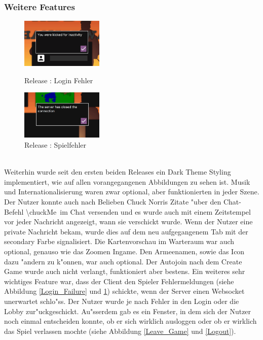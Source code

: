 \documentclass[12pt, titlepage]{scrartcl}
\newcommand{\RN}[1]{%
	\textup{\uppercase\expandafter{\romannumeral#1}}%
}
\begin{document}
		    \subsubsection{Weitere Features}
		        \begin{figure}
                    \begin{center}
                        \includegraphics[width=0.35\textwidth]{images/old_state/additional/LoginFailure.png}
                        \caption{Release \RN{2}: Login Fehler}
                        \label{Login_Failure}
                    \end{center}
                    \begin{center}
                        \includegraphics[width=0.35\textwidth]{images/old_state/additional/WaitingRoomFailure.png}
                        \caption{Release \RN{2}: Spielfehler}
                        \label{Game_Failure}
                    \end{center}
                \end{figure}
		        \ \\ Weiterhin wurde seit den ersten beiden Releases ein Dark Theme Styling implementiert, wie auf allen vorangegangenen Abbildungen zu sehen ist. Musik und Internationalisierung waren zwar optional, aber funktionierten in jeder Szene. Der Nutzer konnte auch nach Belieben Chuck Norris Zitate "uber den Chat-Befehl \glqq \textbackslash chuckMe\grqq\ im Chat versenden und es wurde auch mit einem Zeitstempel vor jeder Nachricht angezeigt, wann sie verschickt wurde. Wenn der Nutzer eine private Nachricht bekam, wurde dies auf dem neu aufgegangenem Tab mit der secondary Farbe signalisiert. Die Kartenvorschau im Warteraum war auch optional, genauso wie das Zoomen Ingame. Den Armeenamen, sowie das Icon dazu "andern zu k"onnen, war auch optional. Der Autojoin nach dem Create Game wurde auch nicht verlangt, funktioniert aber bestens. Ein weiteres sehr wichtiges Feature war, dass der Client den Spieler Fehlermeldungen (siehe Abbildung \ref{Login_Failure} und \ref{Game_Failure}) schickte, wenn der Server einen Websocket unerwartet schlo"ss. Der Nutzer wurde je nach Fehler in den Login oder die Lobby zur"uckgeschickt. Au"sserdem gab es ein Fenster, in dem sich der Nutzer noch einmal entscheiden konnte, ob er sich wirklich ausloggen oder ob er wirklich das Spiel verlassen mochte (siehe Abbildung \ref{Leave_Game} und \ref{Logout}). \\
\end{document}
